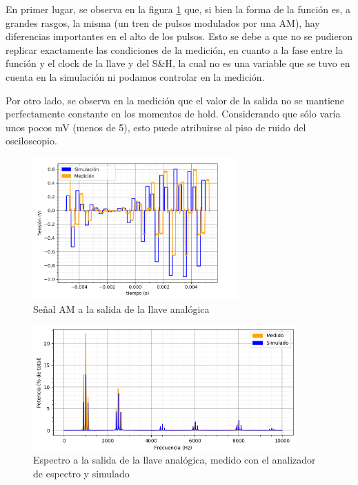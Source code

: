 \documentclass[a4paper]{article}
\begin{document}
En primer lugar, se observa en la figura \ref{fig:ej7_llave} que, si bien la forma de la funci\'on es, a grandes rasgos, la misma (un tren de pulsos modulados por una AM), hay diferencias importantes en el alto de los pulsos. Esto se debe a que no se pudieron replicar exactamente las condiciones de la medici\'on, en cuanto a la fase entre la funci\'on y el clock de la llave y del S\&H, la cual no es una variable que se tuvo en cuenta en la simulaci\'on ni podamos controlar en la medici\'on. 

Por otro lado, se observa en la medici\'on que el valor de la salida no se mantiene perfectamente constante en los momentos de hold. Considerando que s\'olo var\'ia unos pocos mV (menos de 5), esto puede atribuirse al piso de ruido del osciloscopio.

\begin{figure}[htb]
	\centering
	\includegraphics[width=0.7\textwidth]{ej7_meds/med_21.png}
	\caption{Se\~nal AM a la salida de la llave anal\'ogica}
	\label{fig:ej7_llave}
\end{figure}

\begin{figure}[htb]
	\centering
	\includegraphics[width=0.9\textwidth]{ej7_meds/7_llave.png}
	\caption{Espectro a la salida de la llave anal\'ogica, medido con el analizador de espectro y simulado}
	\label{fig:ej7_espectro_llave}
\end{figure}
\end{document}
